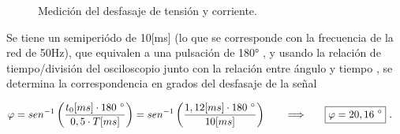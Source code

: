         \begin{figure}[H]
          \centering
          \caption{Medición del desfasaje de tensión y corriente.}
          \label{fig: Desfasaje tensión-corriente.}
        \end{figure}  

        Se tiene un semiperiódo de 10[ms] (lo que se corresponde con la frecuencia de la red de 50Hz),
        que equivalen a una pulsación de 180° , y usando la relación de tiempo/división del 
        osciloscopio junto con la relación entre ángulo y tiempo , se determina la correspondencia 
        en grados del desfasaje de la señal

        \begin{align*}
          \varphi = sen ^{-1} \left( \dfrac{t_{0}[ms] \cdot 180\ ^{\circ}}{0,5 \cdot T[ms]} \right) = sen ^{-1} \left( \dfrac{1,12[ms] \cdot 180\ ^{\circ}}{10[ms]} \right) \hspace{20pt} \Longrightarrow \hspace{20pt} \Aboxed{\varphi = 20,16\ ^{\circ}}\ .
        \end{align*}    

   